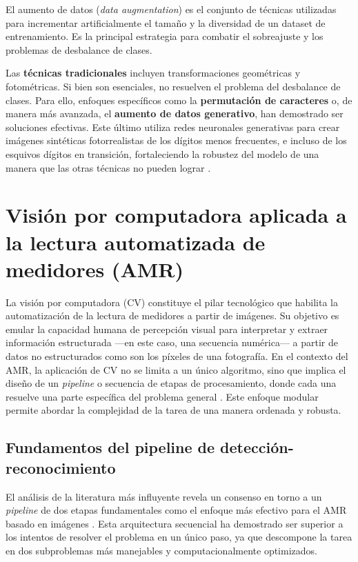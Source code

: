 El aumento de datos (\textit{data augmentation}) es el conjunto de técnicas utilizadas para incrementar artificialmente el tamaño y la diversidad de un dataset de entrenamiento. Es la principal estrategia para combatir el sobreajuste y los problemas de desbalance de clases.

Las \textbf{técnicas tradicionales} incluyen transformaciones geométricas y fotométricas. Si bien son esenciales, no resuelven el problema del desbalance de clases. Para ello, enfoques específicos como la \textbf{permutación de caracteres} \parencite{Laroca2021Towards} o, de manera más avanzada, el \textbf{aumento de datos generativo}, han demostrado ser soluciones efectivas. Este último utiliza redes neuronales generativas para crear imágenes sintéticas fotorrealistas de los dígitos menos frecuentes, e incluso de los esquivos dígitos en transición, fortaleciendo la robustez del modelo de una manera que las otras técnicas no pueden lograr \parencite{Sripanuskul2022Generative}.

\section{Visión por computadora aplicada a la lectura automatizada de medidores (AMR)}
\label{sec:cv_for_amr}

La visión por computadora (CV) constituye el pilar tecnológico que habilita la automatización de la lectura de medidores a partir de imágenes. Su objetivo es emular la capacidad humana de percepción visual para interpretar y extraer información estructurada —en este caso, una secuencia numérica— a partir de datos no estructurados como son los píxeles de una fotografía. En el contexto del AMR, la aplicación de CV no se limita a un único algoritmo, sino que implica el diseño de un \textit{pipeline} o secuencia de etapas de procesamiento, donde cada una resuelve una parte específica del problema general \parencite{Hong2021ImageBased}. Este enfoque modular permite abordar la complejidad de la tarea de una manera ordenada y robusta.

\subsection{Fundamentos del pipeline de detección-reconocimiento}
\label{ssec:pipeline_fundamentals}

El análisis de la literatura más influyente revela un consenso en torno a un \textit{pipeline} de dos etapas fundamentales como el enfoque más efectivo para el AMR basado en imágenes \parencite{Nguyen2025Water, Khan2024LowCost, Laroca2021Towards}. Esta arquitectura secuencial ha demostrado ser superior a los intentos de resolver el problema en un único paso, ya que descompone la tarea en dos subproblemas más manejables y computacionalmente optimizados.

